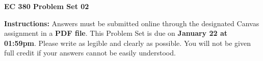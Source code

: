 \documentclass[12pt]{exam}
\newcommand{\examdate}{\fontfamily{lmss} \textbf{January 22 at 01:59pm}} %
\begin{document}
\selectfont

\begin{center}
    \textbf{{\LARGE EC 380 Problem Set 02}} \\
    \bigskip 
\end{center}

\noindent \textbf{Instructions:} 
Answers must be submitted online through the designated Canvas assignment in a \textbf{PDF file}.
This Problem Set is due on \examdate.
Please write as legible and clearly as possible. 
You will not be given full credit if your answers cannot be easily understood. 


\end{document}
